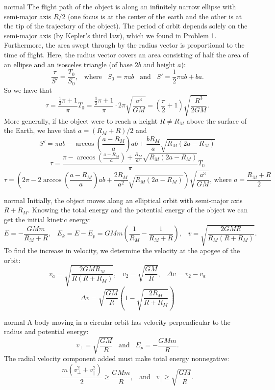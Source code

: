 \documentclass[11pt]{article}
\begin{document}
\begin{answer}{normal} %
The flight path of the object is along an infinitely narrow ellipse with semi-major axis $R/2$ (one focus is at the center of the earth and the other is at the tip of the trajectory of the object). The period of orbit depends solely on the semi-major axis (by Kepler's third law), which we found in Problem 1. Furthermore, the area swept through by the radius vector is proportional to the time of flight. Here, the radius vector covers an area consisting of half the area of an ellipse and an isosceles triangle (of base $2b$ and height $a$):
$$\dfrac{\tau}{S'}=\dfrac{T_0}{S_0},\;\;\;\text{where}\;\;\;S_0=\pi ab\;\;\;\text{and}\;\;\;S'=\dfrac{1}{2}\pi ab+ba.$$
So we have that
$$\tau=\dfrac{\frac{1}{2}\pi+1}{\pi}T_0=\dfrac{\frac{1}{2}\pi+1}{\pi}\cdot2\pi\sqrt{\dfrac{a^3}{GM}}=\left(\dfrac{\pi}{2}+1\right)\sqrt{\dfrac{R^3}{2GM}}.$$
More generally, if the object were to reach a height $R\neq R_M$ above the surface of the Earth, we have that $a=(R_M+R)/2$ and
$$S'=\pi ab-\arccos\left(\dfrac{a-R_M}{a}\right)ab+\dfrac{bR_M}{a}\sqrt{R_M(2a-R_M)}$$
$$\tau =\dfrac{\pi-\arccos\left(\frac{a-R_M}{a}\right)+\frac{R_M}{a^2}\sqrt{R_M(2a-R_M)}}{\pi}T_0$$
$$\tau=\left(2\pi-2\arccos\left(\dfrac{a-R_M}{a}\right)ab+\dfrac{2R_M}{a^2}\sqrt{R_M(2a-R_M)}\right)\sqrt{\dfrac{a^3}{GM}}\text{, where }a=\dfrac{R_M+R}{2}$$
\end{answer}

\begin{answer}{normal} %
Initially, the object moves along an elliptical orbit with semi-major axis $R+R_M$. Knowing the total energy and the potential energy of the object we can get the initial kinetic energy:
$$E=-\dfrac{GMm}{R_M+R},\;\;\;E_k=E-E_p=GMm\left(\dfrac{1}{R_M}-\dfrac{1}{R_M+R}\right),\;\;\;v=\sqrt{\dfrac{2GMR}{R_M(R+R_M)}}.$$
To find the increase in velocity, we determine the velocity at the apogee of the orbit:
$$v_a=\sqrt{\dfrac{2GMR_M}{R(R+R_M)}},\;\;\;v_2=\sqrt{\dfrac{GM}{R}},\;\;\;\Delta v=v_2-v_a$$
$$\Delta v=\sqrt{\dfrac{GM}{R}}\left(1-\sqrt{\dfrac{2R_M}{R+R_M}}\right)$$
\end{answer}

\begin{answer}{normal} %
A body moving in a circular orbit has velocity perpendicular to the radius and potential energy:
$$v_\bot=\sqrt{\dfrac{GM}{R}}\;\;\;\text{and}\;\;\;E_p=-\dfrac{GMm}{R}.$$
The radial velocity component added must make total energy nonnegative:
$$\dfrac{m\left(v_\bot^2+v_\parallel^2\right)}{2}\geq\dfrac{GMm}{R},\;\;\;\text{and}\;\;\;v_\parallel\geq\sqrt{\dfrac{GM}{R}}.$$
\end{answer}
\end{document}
